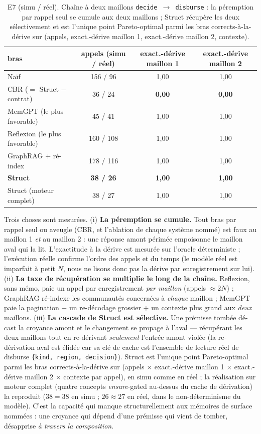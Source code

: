 \documentclass[11pt]{article}
\begin{document}
\begin{table}[h]\centering
\begin{tabular}{lccc}
\toprule
bras & appels (simu / réel) & exact.-dérive maillon 1 & exact.-dérive maillon 2 \\
\midrule
Naïf & 156 / 96 & 1,00 & 1,00 \\
CBR ($=$ Struct $-$ contrat) & 36 / 24 & \textbf{0,00} & \textbf{0,00} \\
MemGPT (le plus favorable) & 45 / 41 & 1,00 & 1,00 \\
Reflexion (le plus favorable) & 160 / 108 & 1,00 & 1,00 \\
GraphRAG $+$ ré-index & 178 / 116 & 1,00 & 1,00 \\
\textbf{Struct} & \textbf{38 / 26} & \textbf{1,00} & \textbf{1,00} \\
Struct (moteur complet) & 38 / 27 & 1,00 & 1,00 \\
\bottomrule
\end{tabular}
\caption{E7 (simu / réel). Chaîne à deux maillons \texttt{decide $\to$ disburse} : la péremption par rappel seul se cumule aux deux maillons ; Struct récupère les deux sélectivement et est l'unique point Pareto-optimal parmi les bras corrects-à-la-dérive sur (appels, exact.-dérive maillon 1, exact.-dérive maillon 2, contexte).}
\label{tab:e7}
\end{table}

Trois choses sont mesurées. (i) \textbf{La péremption se cumule.} Tout bras par rappel seul ou aveugle (CBR, et
l'ablation de chaque système nommé) est faux au maillon 1 \emph{et} au maillon 2 : une réponse amont périmée
empoisonne le maillon aval qui la lit. L'exactitude à la dérive est mesurée sur l'oracle déterministe ; l'exécution
réelle confirme l'ordre des appels et du temps (le modèle réel est imparfait à petit $N$, nous ne lisons donc pas
la dérive par enregistrement sur lui). (ii) \textbf{La taxe de
récupération se multiplie le long de la chaîne.} Reflexion, sans mémo, paie un appel par enregistrement \emph{par
maillon} (appels $\approx 2N$) ; GraphRAG ré-indexe les communautés concernées à \emph{chaque} maillon ; MemGPT
paie la pagination $+$ un re-décodage grossier $+$ un contexte plus grand aux \emph{deux} maillons. (iii)
\textbf{La cascade de Struct est sélective.} Une prémisse tombée dé-cast la croyance amont et le changement se
propage à l'aval --- récupérant les deux maillons tout en re-dérivant \emph{seulement} l'entrée amont violée (la
re-dérivation aval est élidée car sa clé de cache est l'ensemble de lecture réel de disburse
\texttt{\{kind, region, decision\}}). Struct est l'unique point Pareto-optimal parmi les bras corrects-à-la-dérive
sur (appels $\times$ exact.-dérive maillon 1 $\times$ exact.-dérive maillon 2 $\times$ contexte par appel), en simu
comme en réel ; la réalisation sur
moteur complet (quatre concepts \emph{ensure}-gated au-dessus du cache de dérivation) la reproduit ($38{=}38$ en
simu ; $26\approx27$ en réel, dans le non-déterminisme du modèle). C'est la capacité qui manque structurellement
aux mémoires de surface nommées : une croyance qui dépend d'une prémisse qui vient de tomber, désapprise
\emph{à travers la composition}.
\end{document}
